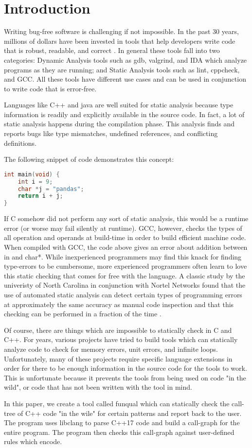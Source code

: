 \chapter{Introduction}

Writing bug-free software is challenging if not impossible.  In the past 30 years, millions of dollars have been invested in tools that help developers write code that is robust, readable, and correct \cite{staticanal}.  In general these tools fall into two categories:  Dynamic Analysis tools such as gdb, valgrind, and IDA which analyze programs as they are running; and Static Analysis tools such as lint, cppcheck, and GCC.  All these tools have different use cases and can be used in conjunction to write code that is error-free.

Languages like C++ and java are well suited for static analysis because type information is readily and explicitly available in the source code.  In fact, a lot of static analysis happens during the compilation phase.  This analysis finds and reports bugs like type mismatches, undefined references, and conflicting definitions.  

The following snippet of code demonstrates this concept:

\begin{lstlisting}[language=C]
int main(void) {
	int i = 9;
	char *j = "pandas";
	return i + j;
}
\end{lstlisting}

If C somehow did not perform any sort of static analysis, this would be a runtime error (or worse may fail silently at runtime).  GCC, however, checks the types of all operation and operands at build-time in order to build efficient machine code.  When compiled with GCC, the code above gives an error about addition between in and char*.  While inexperienced programmers may find this knack for finding type-errors to be cumbersome, more experienced programmers often learn to love this static checking that comes for free with the language.  A classic study by the univeristy of North Carolina in conjunction with Nortel Networks found that the use of automated static analysis can detect certain types of programming errors at approximately the same accuracy as manual code inspection and that this checking can be performed in a fraction of the time \cite{staticanal}.  

Of course, there are things which are impossible to statically check in C and C++.  For years, various projects have tried to build tools which can statically analyze code to check for memory errors, unit errors, and infinite loops.  Unfortunately, many of these projects require specific language extensions in order for there to be enough information in the source code for the tools to work.  This is unfortunate because it prevents the tools from being used on code "in the wild", or code that has not been written with the tool in mind.

In this paper, we create a tool called funqual which can statically check the call-tree of C++ code "in the wile" for certain patterns and report back to the user.  The program uses libclang to parse C++17 code and build a call-graph for the entire program.  The program then checks this call-graph against user-defined rules which encode.
